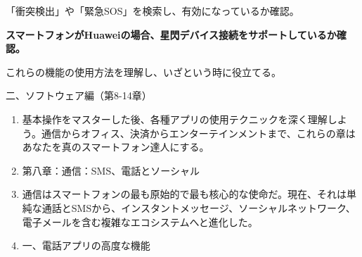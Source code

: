 
「衝突検出」や「緊急SOS」を検索し、有効になっているか確認。

\textbf{スマートフォンがHuaweiの場合、星閃デバイス接続をサポートしているか確認。}\par

これらの機能の使用方法を理解し、いざという時に役立てる。

\begin{tcbpractice}{二、ソフトウェア編（第8-14章）}
\begin{enumerate}
  \item 基本操作をマスターした後、各種アプリの使用テクニックを深く理解しよう。通信からオフィス、決済からエンターテインメントまで、これらの章はあなたを真のスマートフォン達人にする。
  \item 第八章：通信：SMS、電話とソーシャル
  \item 通信はスマートフォンの最も原始的で最も核心的な使命だ。現在、それは単純な通話とSMSから、インスタントメッセージ、ソーシャルネットワーク、電子メールを含む複雑なエコシステムへと進化した。
  \item 一、電話アプリの高度な機能
\end{enumerate}

\end{tcbpractice}
